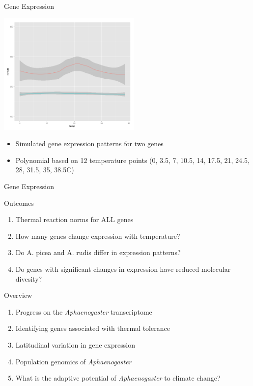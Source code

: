 \documentclass{beamer}
\begin{document}
\begin{frame}{Gene Expression}
	\begin{center}
		\includegraphics[width=7cm,keepaspectratio]{sim_GenEx_sub.png}
	\end{center}
	\begin{itemize}
		\item Simulated gene expression patterns for two genes
		\item Polynomial based on 12 temperature points (0, 3.5, 7, 10.5, 14, 17.5, 21, 24.5, 28, 31.5, 35, 38.5\degree C)
	\end{itemize}
\end{frame}


\begin{frame}{Gene Expression}
	\begin{block}{Outcomes}
		\begin{enumerate}
			\item Thermal reaction norms for ALL genes
			\item How many genes change expression with temperature?
			\item Do A. picea and A. rudis differ in expression patterns?
			\item Do genes with significant changes in expression have reduced molecular divesity?
		\end{enumerate}
	\end{block}


\end{frame}

\begin{frame}{Overview}
	\begin{enumerate}
  		\item Progress on the \textit{Aphaenogaster} transcriptome
	  	\item Identifying genes associated with thermal tolerance
		\item<1-| alert@1> Latitudinal variation in gene expression
	  	\item<1-| alert@1> Population genomics of \textit{Aphaenogaster}
  		\item What is the adaptive potential of \textit{Aphaenogaster} to climate change?
	  \end{enumerate}
\end{frame}
\end{document}
